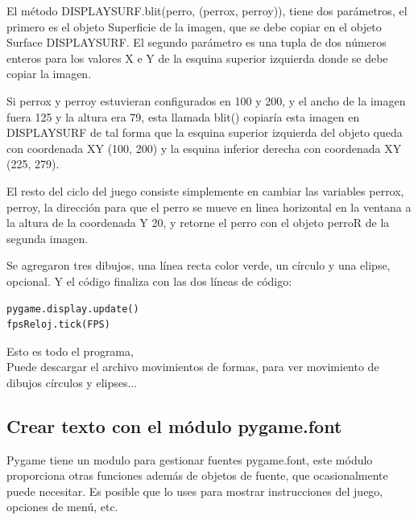 El método {\ttfamily DISPLAYSURF.blit(perro, (perrox, perroy))}, tiene dos parámetros, el primero es el objeto Superficie de la imagen,
que se debe copiar en el objeto Surface DISPLAYSURF. El segundo parámetro es una tupla de dos números enteros para los valores X e Y de la esquina superior izquierda donde se debe copiar la imagen.

Si perrox  y  perroy estuvieran configurados en 100 y 200, y el ancho de la imagen  fuera 125 y la altura
era 79, esta llamada  {\ttfamily blit()} copiaría esta imagen en {\ttfamily DISPLAYSURF} de tal forma que la esquina superior izquierda
del objeto queda con coordenada XY (100, 200) y la esquina inferior derecha con  coordenada XY  (225, 279).


           

El resto del ciclo del juego consiste simplemente en cambiar las variables perrox, perroy, la dirección para que
el perro se mueve en linea horizontal  en la ventana a la altura de la coordenada Y 20, y retorne el perro con el objeto {\ttfamily perroR} de la segunda imagen. 

Se agregaron  tres dibujos, una línea recta color verde, un círculo y una elipse, opcional. Y el código finaliza con las  dos líneas de código:
\begin{lstlisting}
pygame.display.update()
fpsReloj.tick(FPS)	
\end{lstlisting} Esto es todo el programa,   \\


Puede descargar el archivo movimientos de formas, para ver movimiento de dibujos círculos y elipses...







\subsection{Crear texto con el módulo pygame.font}
 
Pygame tiene un modulo para gestionar fuentes {\ttfamily pygame.font}, este  módulo  proporciona otras funciones además
de objetos de fuente, que ocasionalmente puede necesitar. Es posible que lo uses para mostrar instrucciones del juego,
opciones de menú, etc. 

